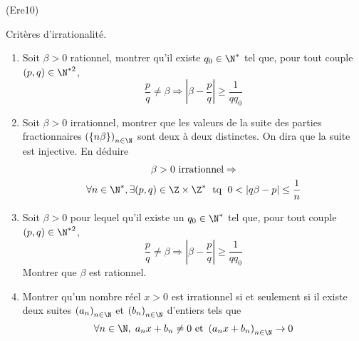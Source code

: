 \begin{tiny}(Ere10)\end{tiny} Critères d'irrationalité.
\begin{enumerate}
 \item Soit $\beta >0$ rationnel, montrer qu'il existe $q_0\in \N^*$ tel que, pour tout couple $(p,q)\in \N^{*2}$,
\begin{displaymath}
 \frac{p}{q}\neq \beta \Rightarrow \left| \beta - \frac{p}{q}\right| \geq \frac{1}{qq_0}
\end{displaymath}
 \item Soit $\beta >0$ irrationnel, montrer que les valeurs de la suite des parties fractionnaires $\left( \{n\beta\} \right) _{n\in \N}$ sont deux à deux distinctes. On dira que la suite est injective. En déduire
\begin{multline*}
\beta > 0 \text{ irrationnel} \Rightarrow \\
\forall n \in \N^*, \exists(p,q)\in \Z\times \Z^*\; \text{ tq }\; 0 < \left| q\beta - p\right| \leq \frac{1}{n}
\end{multline*}

 \item Soit $\beta >0$ pour lequel qu'il existe un $q_0\in \N^*$ tel que, pour tout couple $(p,q)\in \N^{*2}$,
\begin{displaymath}
 \frac{p}{q}\neq \beta \Rightarrow \left| \beta - \frac{p}{q}\right| \geq \frac{1}{qq_0}
\end{displaymath}
Montrer que $\beta$ est rationnel.
\item Montrer qu'un nombre réel $x>0$ est irrationnel si et seulement si il existe deux suites $\left( a_n\right) _{n\in \N}$ et $\left( b_n\right) _{n\in \N}$ d'entiers tels que
\begin{displaymath}
 \forall n \in \N,\; a_nx+b_n \neq 0 \text{ et }
 \left( a_nx + b_n \right) _{n\in \N} \rightarrow 0
\end{displaymath}

\end{enumerate}
